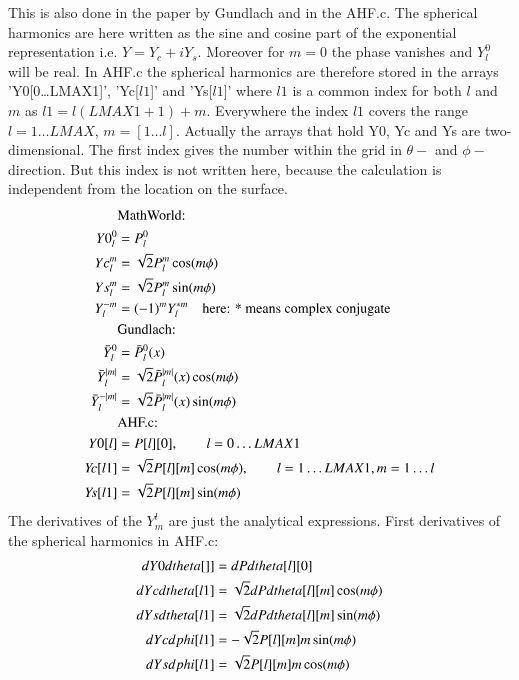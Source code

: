 \documentclass[11pt,a4paper,twoside]{article}
\begin{document}
This is also done in the paper by Gundlach and in the AHF.c. 
The spherical harmonics are here written as the sine and 
cosine part of the exponential representation i.e. $Y = Y_c + i Y_s$.
Moreover for $m=0$ the phase vanishes
and $Y_l^0$ will be real. In AHF.c the spherical harmonics are therefore
stored in the arrays 'Y0[0\dots LMAX1]', 'Yc[$l1$]' and 'Ys[$l1$]' where
$l1$ is a common index for both $l$ and $m$ as $l1=l (LMAX1+1)+m$.
Everywhere the index $l1$ covers the range $l=1\dots LMAX$, $m = [1 \dots l]$.
Actually the arrays that hold Y0, Yc and Ys are two-dimensional. The first index gives
the number within the grid in $\theta-$ and $\phi-$direction. But this index
is not written here, because the calculation is independent from the location
on the surface.
\begin{align}
  &\text{MathWorld:}\notag\\
  Y0^0_l &= P^0_l \\
  Yc^m_l &= \sqrt{2} P^m_l \cos (m\phi)\\
  Ys^m_l &= \sqrt{2} P^m_l \sin (m\phi)\\
  Y^{-m}_l &= (-1)^m Y^{*m}_l\quad 
    \text{here: * means complex conjugate}\\
  &\text{Gundlach:}\notag\\
  \bar Y^0_l &= \bar P^0_l(x)\\
  \bar Y^{|m|}_l  &= \sqrt{2} \bar P^{|m|}_l(x) \cos(m \phi)\\
  \bar Y^{-|m|}_l &= \sqrt{2} \bar P^{|m|}_l(x) \sin(m \phi)\\
  &\text{AHF.c:}\notag\\
  Y0[l] &=  P[l][0], \qquad l=0\dots LMAX1 \\
  Y\!c[l1]&= \sqrt{2} P[l][m] \cos(m\phi), \qquad l=1\dots LMAX1, m=1\dots l \\
  Y\!s[l1]&= \sqrt{2} P[l][m] \sin(m\phi)
\end{align}
The derivatives of the $Y^l_m$ are just the analytical expressions.
First derivatives of the spherical harmonics in AHF.c:
\begin{align}
  dY0dtheta[]] &= dPdtheta[l][0]\\
  dYcdtheta[l1]&=\sqrt{2} dPdtheta[l][m] \cos(m\phi)\notag \\
  dYsdtheta[l1]&=\sqrt{2} dPdtheta[l][m] \sin(m\phi)\\
  dYcdphi[l1]&=-\sqrt{2} P[l][m] m \sin(m\phi)\notag\\
  dYsdphi[l1]&= \sqrt{2} P[l][m] m \cos(m\phi)
\end{align}
\end{document}
